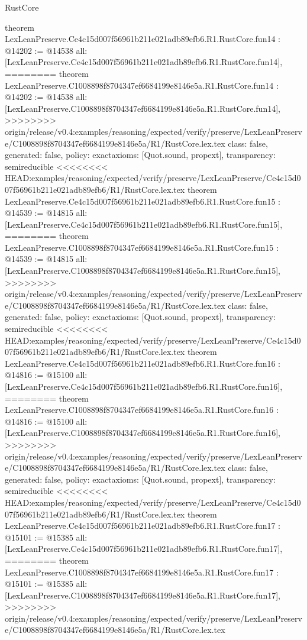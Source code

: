 \begin{lexlean}{RustCore}
\begin{coremodule}
{\begin{coremodule}
{{{{{{{{{{{{{{{{theorem LexLeanPreserve.Ce4c15d007f56961b211e021adb89efb6.R1.RustCore.fun14 : @14202 := @14538 {
  all: [LexLeanPreserve.Ce4c15d007f56961b211e021adb89efb6.R1.RustCore.fun14],
========
theorem LexLeanPreserve.C1008898f8704347ef6684199e8146e5a.R1.RustCore.fun14 : @14202 := @14538 {
  all: [LexLeanPreserve.C1008898f8704347ef6684199e8146e5a.R1.RustCore.fun14],
>>>>>>>> origin/release/v0.4:examples/reasoning/expected/verify/preserve/LexLeanPreserve/C1008898f8704347ef6684199e8146e5a/R1/RustCore.lex.tex
  class: false,
  generated: false,
  policy: exact{axioms: [Quot.sound, propext]},
  transparency: semireducible
}
<<<<<<<< HEAD:examples/reasoning/expected/verify/preserve/LexLeanPreserve/Ce4c15d007f56961b211e021adb89efb6/R1/RustCore.lex.tex
theorem LexLeanPreserve.Ce4c15d007f56961b211e021adb89efb6.R1.RustCore.fun15 : @14539 := @14815 {
  all: [LexLeanPreserve.Ce4c15d007f56961b211e021adb89efb6.R1.RustCore.fun15],
========
theorem LexLeanPreserve.C1008898f8704347ef6684199e8146e5a.R1.RustCore.fun15 : @14539 := @14815 {
  all: [LexLeanPreserve.C1008898f8704347ef6684199e8146e5a.R1.RustCore.fun15],
>>>>>>>> origin/release/v0.4:examples/reasoning/expected/verify/preserve/LexLeanPreserve/C1008898f8704347ef6684199e8146e5a/R1/RustCore.lex.tex
  class: false,
  generated: false,
  policy: exact{axioms: [Quot.sound, propext]},
  transparency: semireducible
}
<<<<<<<< HEAD:examples/reasoning/expected/verify/preserve/LexLeanPreserve/Ce4c15d007f56961b211e021adb89efb6/R1/RustCore.lex.tex
theorem LexLeanPreserve.Ce4c15d007f56961b211e021adb89efb6.R1.RustCore.fun16 : @14816 := @15100 {
  all: [LexLeanPreserve.Ce4c15d007f56961b211e021adb89efb6.R1.RustCore.fun16],
========
theorem LexLeanPreserve.C1008898f8704347ef6684199e8146e5a.R1.RustCore.fun16 : @14816 := @15100 {
  all: [LexLeanPreserve.C1008898f8704347ef6684199e8146e5a.R1.RustCore.fun16],
>>>>>>>> origin/release/v0.4:examples/reasoning/expected/verify/preserve/LexLeanPreserve/C1008898f8704347ef6684199e8146e5a/R1/RustCore.lex.tex
  class: false,
  generated: false,
  policy: exact{axioms: [Quot.sound, propext]},
  transparency: semireducible
}
<<<<<<<< HEAD:examples/reasoning/expected/verify/preserve/LexLeanPreserve/Ce4c15d007f56961b211e021adb89efb6/R1/RustCore.lex.tex
theorem LexLeanPreserve.Ce4c15d007f56961b211e021adb89efb6.R1.RustCore.fun17 : @15101 := @15385 {
  all: [LexLeanPreserve.Ce4c15d007f56961b211e021adb89efb6.R1.RustCore.fun17],
========
theorem LexLeanPreserve.C1008898f8704347ef6684199e8146e5a.R1.RustCore.fun17 : @15101 := @15385 {
  all: [LexLeanPreserve.C1008898f8704347ef6684199e8146e5a.R1.RustCore.fun17],
>>>>>>>> origin/release/v0.4:examples/reasoning/expected/verify/preserve/LexLeanPreserve/C1008898f8704347ef6684199e8146e5a/R1/RustCore.lex.tex
}}}}}}}}}}}}}}}}}}}}}
\end{coremodule}}
\end{coremodule}
\end{lexlean}
